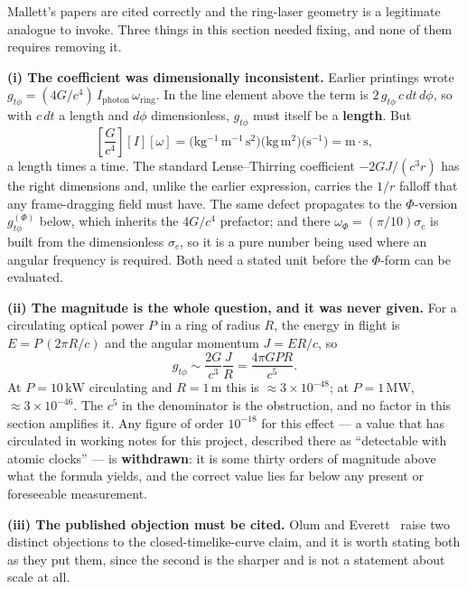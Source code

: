 \begin{remark}
\label{rem:mallett-magnitude-2026-10-03}
Mallett's papers are cited correctly and the ring-laser geometry is a legitimate
analogue to invoke. Three things in this section needed fixing, and none of them
requires removing it.

\textbf{(i) The coefficient was dimensionally inconsistent.} Earlier printings
wrote $g_{t\phi} = (4G/c^{4})\,I_{\mathrm{photon}}\,\omega_{\mathrm{ring}}$. In
the line element above the term is $2\,g_{t\phi}\,c\,dt\,d\phi$, so with $c\,dt$
a length and $d\phi$ dimensionless, $g_{t\phi}$ must itself be a
\textbf{length}. But
\[
\left[\frac{G}{c^{4}}\right]\!\left[I\right]\!\left[\omega\right]
= \bigl(\mathrm{kg^{-1}\,m^{-1}\,s^{2}}\bigr)\bigl(\mathrm{kg\,m^{2}}\bigr)\bigl(\mathrm{s^{-1}}\bigr)
= \mathrm{m\cdot s},
\]
a length times a time. The standard Lense--Thirring coefficient
$-2GJ/(c^{3}r)$ has the right dimensions and, unlike the earlier expression,
carries the $1/r$ falloff that any frame-dragging field must have. The same
defect propagates to the $\Phi$-version $g_{t\phi}^{(\Phi)}$ below, which inherits
the $4G/c^{4}$ prefactor; and there $\omega_{\Phi} = (\pi/10)\sigma_c$ is built
from the dimensionless $\sigma_c$, so it is a pure number being used where an
angular frequency is required. Both need a stated unit before the $\Phi$-form can
be evaluated.

\textbf{(ii) The magnitude is the whole question, and it was never given.} For a
circulating optical power $P$ in a ring of radius $R$, the energy in flight is
$E = P\,(2\pi R/c)$ and the angular momentum $J = ER/c$, so
\[
g_{t\phi} \sim \frac{2G}{c^{3}}\frac{J}{R}
= \frac{4\pi G P R}{c^{5}}.
\]
At $P = 10\,\mathrm{kW}$ circulating and $R = 1\,\mathrm{m}$ this is
$\approx 3\times10^{-48}$; at $P = 1\,\mathrm{MW}$, $\approx 3\times10^{-46}$.
The $c^{5}$ in the denominator is the obstruction, and no factor in this section
amplifies it. Any figure of order $10^{-18}$ for this effect --- a value that has
circulated in working notes for this project, described there as ``detectable
with atomic clocks'' --- is \textbf{withdrawn}: it is some thirty orders of
magnitude above what the formula yields, and the correct value lies far below
any present or foreseeable measurement.

\textbf{(iii) The published objection must be cited.} Olum and
Everett~\cite{olum2005circulating} raise two distinct objections to the
closed-timelike-curve claim, and it is worth stating both as they put them, since
the second is the sharper and is not a statement about scale at all.


\end{remark}
